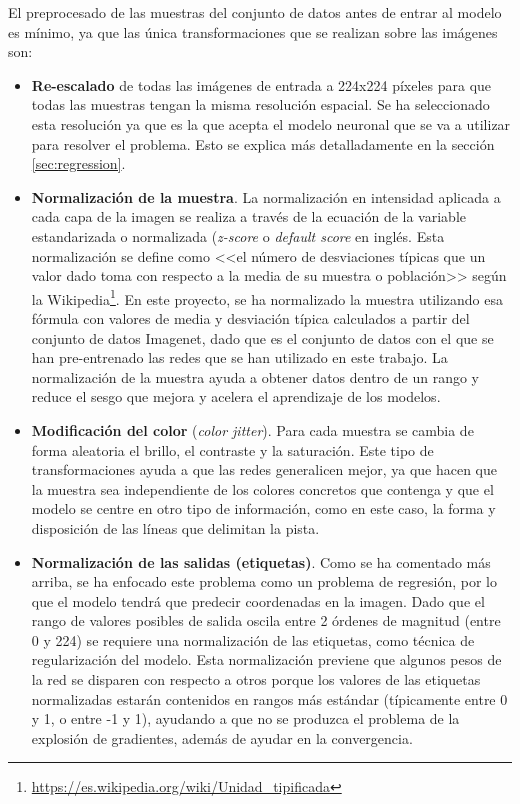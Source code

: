 El preprocesado de las muestras del conjunto de datos antes de entrar al modelo es mínimo, ya que las única transformaciones que se realizan sobre las imágenes son: 

\begin{itemize}
    \item \textbf{Re-escalado} de todas las imágenes de entrada a 224x224 píxeles para que todas las muestras tengan la misma resolución espacial. Se ha seleccionado esta resolución ya que es la que acepta el modelo neuronal que se va a utilizar para resolver el problema. Esto se explica más detalladamente en la sección \ref{sec:regression}.
    \item \textbf{Normalización de la muestra}. La normalización en intensidad aplicada a cada capa de la imagen se realiza a través de la ecuación de la variable estandarizada o normalizada (\textit{z-score} o \textit{default score} en inglés. Esta normalización se define como <<el número de desviaciones típicas que un valor dado toma con respecto a la media de su muestra o población>> según la Wikipedia\footnote{\url{https://es.wikipedia.org/wiki/Unidad_tipificada}}. En este proyecto, se ha normalizado la muestra utilizando esa fórmula con valores de media y desviación típica calculados a partir del conjunto de datos Imagenet, dado que es el conjunto de datos con el que se han pre-entrenado las redes que se han utilizado en este trabajo. La normalización de la muestra ayuda a obtener datos dentro de un rango y reduce el sesgo que mejora y acelera el aprendizaje de los modelos.
    \item \textbf{Modificación del color} (\textit{color jitter}). Para cada muestra se cambia de forma aleatoria el brillo, el contraste y la saturación. Este tipo de transformaciones ayuda a que las redes generalicen mejor, ya que hacen que la muestra sea independiente de los colores concretos que contenga y que el modelo se centre en otro tipo de información, como en este caso, la forma y disposición de las líneas que delimitan la pista.
    \item \textbf{Normalización de las salidas (etiquetas)}. Como se ha comentado más arriba, se ha enfocado este problema como un problema de regresión, por lo que el modelo tendrá que predecir coordenadas en la imagen. Dado que el rango de valores posibles de salida oscila entre 2 órdenes de magnitud (entre 0 y 224) se requiere una normalización de las etiquetas, como técnica de regularización del modelo. Esta normalización previene que algunos pesos de la red se disparen con respecto a otros porque los valores de las etiquetas normalizadas estarán contenidos en rangos más estándar (típicamente entre 0 y 1, o entre -1 y 1), ayudando a que no se produzca el problema de la explosión de gradientes, además de ayudar en la convergencia.
\end{itemize}

